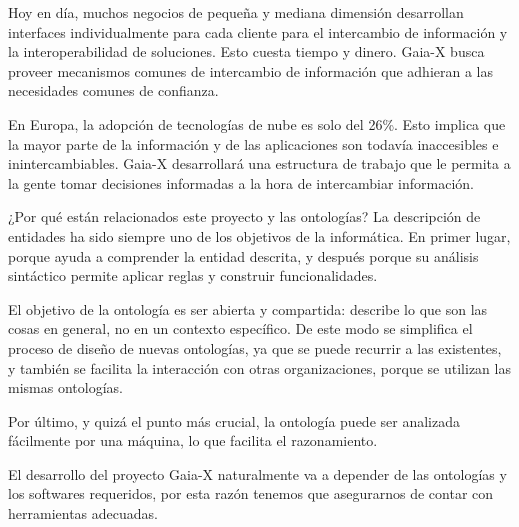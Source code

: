 Hoy en día, muchos negocios de pequeña y mediana dimensión desarrollan interfaces individualmente para cada cliente para el intercambio de información y la interoperabilidad de soluciones. Esto cuesta tiempo y dinero. Gaia-X busca proveer mecanismos comunes de intercambio de información que adhieran a las necesidades comunes de confianza.

En Europa, la adopción de tecnologías de nube es solo del 26\%. Esto implica que la mayor parte de la información y de las aplicaciones son todavía inaccesibles e inintercambiables. Gaia-X desarrollará una estructura de trabajo que le permita a la gente tomar decisiones informadas a la hora de intercambiar información. 

¿Por qué están relacionados este proyecto y las ontologías? La descripción de entidades ha sido siempre uno de los objetivos de la informática. En primer lugar, porque ayuda a comprender la entidad descrita, y después porque su análisis sintáctico permite aplicar reglas y construir funcionalidades.

El objetivo de la ontología es ser abierta y compartida: describe lo que son las cosas en general, no en un contexto específico. De este modo se simplifica el proceso de diseño de nuevas ontologías, ya que se puede recurrir a las existentes, y también se facilita la interacción con otras organizaciones, porque se utilizan las mismas ontologías.

Por último, y quizá el punto más crucial, la ontología puede ser analizada fácilmente por una máquina, lo que facilita el razonamiento. \cite[]{GaiaxOntology}

El desarrollo del proyecto Gaia-X naturalmente va a depender de las ontologías y los softwares requeridos, por esta razón tenemos que asegurarnos de contar con herramientas adecuadas.
